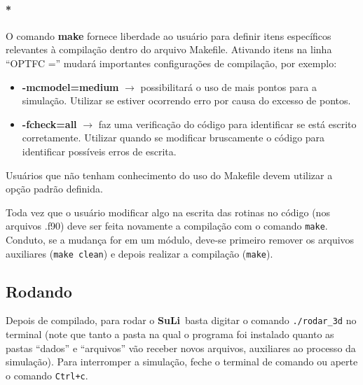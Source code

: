 \documentclass[12pt, a4paper]{article}
\newcommand{\SL}{{\bf SuLi}}
\begin{document}
\paragraph{*}	\label{infosmake}
O comando {\bf{make}} fornece liberdade ao usuário para definir itens específicos relevantes à compilação dentro do arquivo Makefile. Ativando itens na linha ``OPTFC ='' mudará importantes configurações de compilação, por exemplo:

\begin{itemize}
    \item\textbf{-mcmodel=medium} $\rightarrow$ possibilitará o uso de mais pontos para a simulação. Utilizar se estiver ocorrendo erro por causa do excesso de pontos.

    \item\textbf{-fcheck=all} $\rightarrow$ faz uma verificação do código para identificar se está escrito corretamente. Utilizar quando se modificar bruscamente o código para identificar possíveis erros de escrita.
\end{itemize}

Usuários que não tenham conhecimento do uso do Makefile devem utilizar a opção padrão definida.

Toda vez que o usuário modificar algo na escrita das rotinas no código (nos arquivos .f90) deve ser feita novamente a compilação com o comando \verb!make!. Conduto, se a mudança for em um módulo, deve-se primeiro remover os arquivos auxiliares (\verb!make clean!) e depois realizar a compilação (\verb!make!).

\subsection{Rodando}
Depois de compilado, para rodar o \SL\ basta digitar o comando \verb!./rodar_3d! no terminal (note que tanto a pasta na qual o programa foi instalado quanto as pastas ``dados'' e ``arquivos'' vão receber novos arquivos, auxiliares ao processo da simulação). Para interromper a simulação, feche o terminal de comando ou aperte o comando \verb!Ctrl+c!.


\newpage

\end{document}
